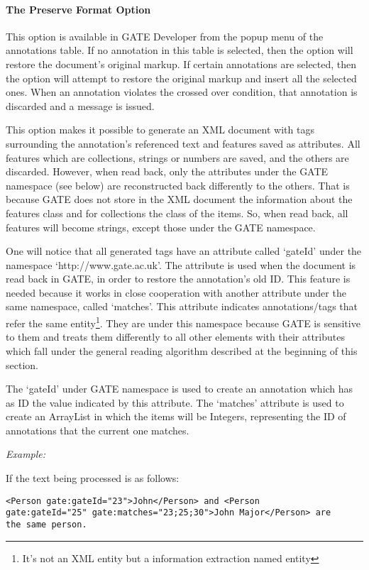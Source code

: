 \paragraph{The Preserve Format Option}

This option is available in GATE Developer from the popup menu of
the annotations table. If no annotation in this table is selected,
then the option will restore the document's original markup. If
certain annotations are selected, then the option will attempt to
restore the original markup and insert all the selected ones. When
an annotation violates the crossed over condition, that annotation
is discarded and a message is issued.

This option makes it possible to generate an XML document with tags
surrounding the annotation's referenced text and features saved as
attributes. All features which are collections, strings or numbers
are saved, and the others are discarded. However, when read back,
only the attributes under the GATE namespace (see below) are
reconstructed back differently to the others. That is because GATE
does not store in the XML document the information about the
features class and for collections the class of the items. So,
when read back, all features will become strings, except those
under the GATE namespace.

One will notice that all generated tags have an attribute called
`gateId' under the namespace `http://www.gate.ac.uk'. The
attribute is used when the document is read back in GATE, in order
to restore the annotation's old ID. This feature is needed because
it works in close cooperation with another attribute under the
same namespace, called `matches'. This attribute indicates
annotations/tags that refer the same entity\footnote{It's not an
XML entity but a information extraction named entity}. They are
under this namespace because GATE is sensitive to them and treats
them differently to all other elements with their attributes
which fall under the general reading algorithm described at the
beginning of this section.

The `gateId' under GATE namespace is used to create an
annotation which has as ID the value indicated by this
attribute. The `matches' attribute is used to create an
ArrayList in which the items will be Integers, representing the ID
of annotations that the current one matches.

{\em Example:}

If the text being processed is as follows:

\small
\begin{small}
\begin{verbatim}
<Person gate:gateId="23">John</Person> and <Person
gate:gateId="25" gate:matches="23;25;30">John Major</Person> are
the same person.
\end{verbatim}
\end{small}
\nnormalsize

